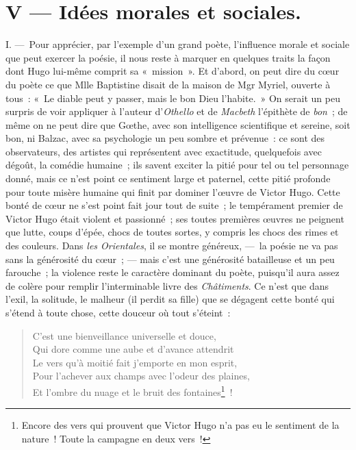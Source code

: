 \documentclass[french,twoside]{book} %
\begin{document}
\section[{V — Idées morales et sociales.}]{V — Idées morales et sociales.}
\noindent I. — Pour apprécier, par l’exemple d’un grand poète, l’influence morale et sociale que peut exercer la poésie, il nous reste à marquer en quelques traits la façon dont Hugo lui-même comprit sa « mission ». Et d’abord, on peut dire du cœur du poète ce que Mlle Baptistine disait de la maison de Mgr Myriel, ouverte à tous : « Le diable peut y passer, mais le bon Dieu l’habite. » On serait un peu surpris de voir appliquer à l’auteur d’\emph{Othello} et de \emph{Macbeth} l’épithète de \emph{bon} ; de même on ne peut dire que Gœthe, avec son intelligence scientifique et sereine, soit bon, ni Balzac, avec sa psychologie un peu sombre et prévenue : ce sont des observateurs, des artistes qui représentent avec exactitude, quelquefois avec dégoût, la comédie humaine ; ils savent exciter la pitié pour tel ou tel personnage donné, mais ce n’est point ce sentiment large et paternel, cette pitié profonde pour toute misère humaine qui finit par dominer l’œuvre de Victor Hugo. Cette bonté de cœur ne s’est point fait jour tout de suite ; le tempérament premier de Victor Hugo était violent et passionné ; ses toutes premières œuvres ne peignent que lutte, coups d’épée, chocs de toutes sortes, y compris les chocs des rimes et des couleurs. Dans \emph{les Orientales}, il se montre généreux, — la poésie ne va pas sans la générosité du cœur ; — mais c’est une générosité batailleuse et un peu farouche ; la violence reste le caractère dominant du poète, puisqu’il aura assez de colère pour remplir l’interminable livre des \emph{Châtiments}. Ce n’est que dans l’exil, la solitude, le malheur (il perdit sa fille) que se dégagent cette bonté qui s’étend à toute chose, cette douceur où tout s’éteint :\par


\begin{verse}
C’est une bienveillance universelle et douce,\\
Qui dore comme une aube et d’avance attendrit\\
Le vers qu’à moitié fait j’emporte en mon esprit,\\
Pour l’achever aux champs avec l’odeur des plaines,\\
Et l’ombre du nuage et le bruit des fontaines\footnote{Encore des vers qui prouvent que Victor Hugo n’a pas eu le sentiment de la nature ! Toute la campagne en deux vers !} !\\
\end{verse}
\end{document}
